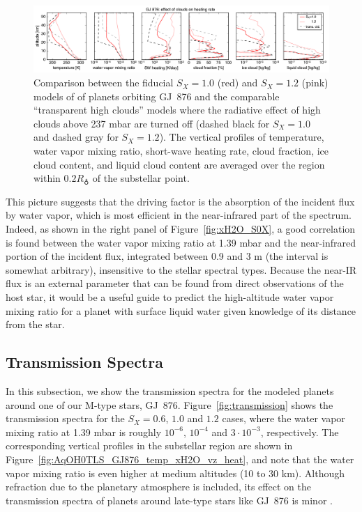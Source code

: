 \documentclass[11pt,numberedappendix,twocolappendix,]{emulateapj}
\def\preslevel{1.39 mbar}
\def\wv{water vapor}
\begin{document}
\begin{figure}[htb]
    \begin{center}
    \includegraphics[width=1\hsize]{GJ876_heat_cld.pdf}
    \end{center}
\caption{Comparison between the fiducial $S_X=1.0$ (red) and $S_X=1.2$ (pink) models of of planets orbiting GJ~876 and the comparable ``transparent high clouds'' models where the radiative effect of high clouds above 237 mbar are turned off (dashed black for $S_X=1.0$ and dashed gray for $S_X=1.2$). The vertical profiles of temperature, \wv{} mixing ratio, short-wave heating rate, cloud fraction, ice cloud content, and liquid cloud content are averaged over the region within $0.2R_\earth $ of the substellar point. }
\label{fig:GJ876_heat_cld}
\end{figure}

This picture suggests that the driving factor is the absorption of the incident flux by water vapor, which is most efficient in the near-infrared part of the spectrum. 
Indeed, as shown in the right panel of Figure~\ref{fig:xH2O_S0X}, a good correlation is found between the \wv{} mixing ratio at \preslevel{} and the near-infrared portion of the incident flux, integrated between 0.9 and 3 \textmu m (the interval is somewhat arbitrary), insensitive to the stellar spectral types. 
Because the near-IR flux is an external parameter that can be found from direct observations of the host star, it would be a useful guide to predict the high-altitude \wv{}  mixing ratio for a planet with surface liquid water given knowledge of its distance from the star. 


\subsection{Transmission Spectra}
\label{ss:result_TransmissionSpectra}

In this subsection, we show the transmission spectra for the modeled planets around one of our M-type stars, GJ~876. 
Figure~\ref{fig:transmission} shows the transmission spectra for the $S_X=0.6$, $1.0$ and $1.2$ cases, where the \wv{} mixing ratio at \preslevel{} is roughly $10^{-6}$, $10^{-4}$ and $3\cdot 10^{-3}$, respectively. 
The corresponding vertical profiles in the substellar region are shown in Figure~\ref{fig:AqOH0TLS_GJ876_temp_xH2O_vz_heat}, and note that the \wv{} mixing ratio is even higher at medium altitudes (10 to 30 km).
Although refraction due to the planetary atmosphere is included, its effect on the transmission spectra of planets around late-type stars like GJ~876 is minor \citep{Betremieux2014,Misra2014}. 
\end{document}
